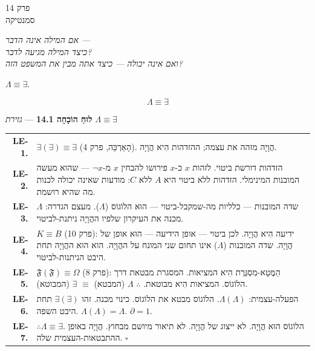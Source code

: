 \documentclass[10pt, openany, oneside]{book}
\renewcommand{\footnotesize}{\fontsize{8.5}{11}\selectfont}
\renewcommand{\large}{\fontsize{11.5}{14}\selectfont}
\renewcommand{\huge}{\fontsize{17}{21}\selectfont}
\begin{document}
\newpage

\begin{center}
    {\huge\textsc{פרק 14}}\\[0.3em]
    {\large\textsc{סמנטיקה}}
\end{center}

\vspace{1.5em}

\begin{center}
    \textit{%
    אם המילה אינה הדבר —\\
    כיצד המילה מגיעה לדבר?\\
    ואם אינה יכולה — כיצד אתה מבין את המשפט הזה?}
\end{center}

\vspace{2em}


\noindent $\Lambda \equiv \exists$.

$$\boxed{\Lambda \equiv \exists}$$

\vspace{0.5em}

\textbf{לוּחַ הוֹכָחָה 14.1} --- \textit{גזירת $\Lambda \equiv \exists$}

\vspace{0.5em}

{\footnotesize
\noindent\begin{tabular}{r p{}}
\textbf{LE-1.} & $\exists(\exists) \equiv \exists$ (הָאַרְכֵּה, פרק 4). הֲוָיָה מזהה את עצמה; ההזדהות הִיא הֲוָיָה. \\[0.3em]
\textbf{LE-2.} & הזדהות דורשת ביטוי. לזהות $x$ כ-$x$ פירושו להבחין $x$ מ-$\neg x$ — שהוא מעשה המובנות המינימלי. הזדהות ללא ביטוי היא $A$ ללא $C$: מודעות שאינה יכולה לכנות מה שהיא רושמת. \\[0.3em]
\textbf{LE-3.} & שדה המובנות — כלליות מה-שמקבל-ביטוי — הוּא הלוֹגוֹס ($\Lambda$). מעצם הגדרה: $\Lambda$ מכנה את העיקרון שלפיו ההֲוָיָה ניתנת-לביטוי. \\[0.3em]
\textbf{LE-4.} & $K \equiv B$ (פרק 10): ידיעה הִיא הֲוָיָה. לכן ביטוי — אופן הידיעה — הוּא אופן של הֲוָיָה. שדה המובנות ($\Lambda$) אינו תחום שני המונח על ההֲוָיָה. הוא הוּא ההֲוָיָה תחת היבט הניתנות-לביטוי. \\[0.3em]
\textbf{LE-5.} & $\mathfrak{F}(\mathfrak{F}) \equiv \Omega$ (פרק 8): הַמֶּטָא-מִסְגֶּרֶת הִיא המציאות. המסגרת מבטאת דרך הלוֹגוֹס. המציאות הִיא מבוטאת. $\therefore$ $\Lambda$ (המבטא) $\equiv$ $\exists$ (המבוטא). \\[0.3em]
\textbf{LE-6.} & הפעלה-עצמית: $\Lambda(\Lambda)$. הלוֹגוֹס מבטא את הלוֹגוֹס. כינוי מכנה. זהו $\exists(\exists)$ תחת היבט השפה. $\Lambda(\Lambda) = \Lambda$. $\partial = 1$. \\[0.3em]
\textbf{LE-7.} & $\therefore \Lambda \equiv \exists$. הלוֹגוֹס הוּא הֲוָיָה. לא ייצוג של הֲוָיָה. לא תיאור מיושם מבחוץ. הֲוָיָה באופן ההתבטאות-העצמית שלה. $\square$ \\[0.3em]
\end{tabular}
}
\end{document}
